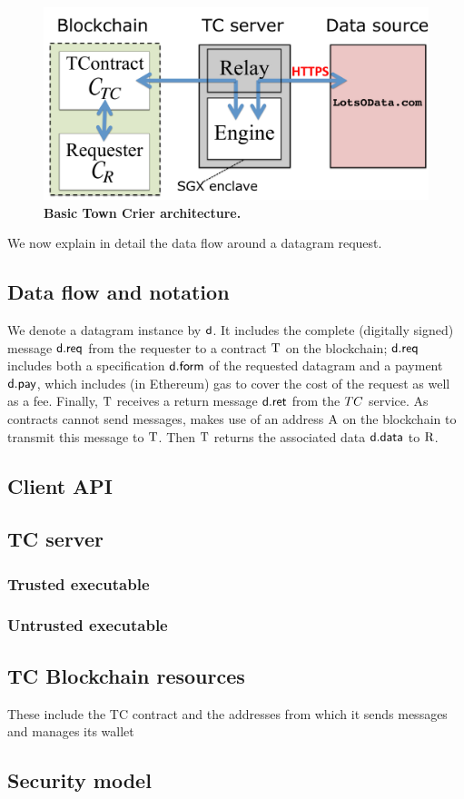 \vspace{-2mm}
\begin{figure}[h!]
\centering
\includegraphics[width=\columnwidth]{OverviewFig}
\caption{{\bf Basic Town Crier architecture.}}
\label{fig:overview}
\end{figure}
\vspace{-2mm}

We now explain in detail the data flow around a datagram request. 

\subsection{Data flow and notation}


We denote a datagram instance by ${\sf d}$. It includes the complete (digitally signed) message ${\sf d.req}$ from the requester to a \tc contract $\tcont$ on the blockchain; ${\sf d.req}$ includes both a specification ${\sf d.form}$ of the requested datagram and a payment ${\sf d.pay}$, which includes (in Ethereum) gas to cover the cost of the request as well as a fee. Finally, $\tcont$ receives a return message ${\sf d.ret}$ from the $TC$ service. As contracts cannot send messages, \tc makes use of an address $\tcadd$ on the blockchain to transmit this message to $\tcont$. Then $\tcont$ returns the associated data ${\sf d.data}$ to $\reqcont$. 



\subsection{Client API}
\subsection{TC server}
\subsubsection{Trusted executable}
\subsubsection{Untrusted executable}
\subsection{TC Blockchain resources}
These include the TC contract and the addresses from which it sends messages and manages its wallet
\subsection{Security model}


